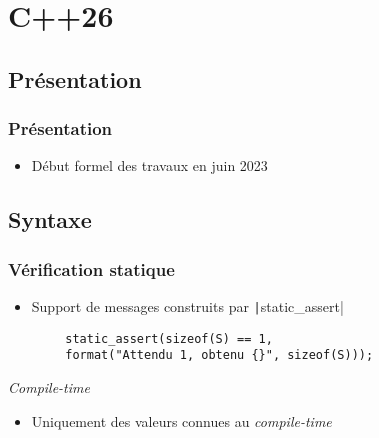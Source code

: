 \documentclass[C++.tex]{subfiles}
\begin{document}
\section{C++26}
\subsection*{Présentation}
\begin{frame}
	\frametitle{Présentation}
	\begin{itemize}
		\item Début formel des travaux en juin 2023
	\end{itemize}
\end{frame}

\subsection*{Syntaxe}
\begin{frame}[fragile]
	\frametitle{Vérification statique}
	\begin{itemize}
		\item Support de messages construits par \texttt|static_assert|
	\end{itemize}

	\begin{verbatim}
		static_assert(sizeof(S) == 1,
		format("Attendu 1, obtenu {}", sizeof(S)));
	\end{verbatim}

	\begin{alertblock}{\textit{Compile-time}}
		\begin{itemize}
			\item Uniquement des valeurs connues au \textit{compile-time}
		\end{itemize}
	\end{alertblock}

\end{frame}
\end{document}
